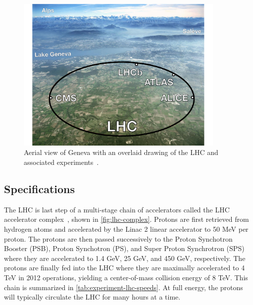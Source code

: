 \begin{figure}[tp]
  \centering
  \includegraphics[width=0.90\textwidth]{figures/lhc-atlas/lhc-switzerland}
  \caption{Aerial view of Geneva with an overlaid drawing of the LHC and associated experiments~\cite{atlas-surface}.}
  \label{fig:lhc-switzerland}
\end{figure}

\subsection{Specifications}

The LHC is last step of a multi-stage chain of accelerators called the LHC accelerator complex~\cite{cern-accelerators}, shown in \cref{fig:lhc-complex}. Protons are first retrieved from hydrogen atoms and accelerated by the Linac 2 linear accelerator to 50 MeV per proton. The protons are then passed successively to the Proton Synchotron Booster (PSB), Proton Synchotron (PS), and Super Proton Synchrotron (SPS) where they are accelerated to 1.4 GeV, 25 GeV, and 450 GeV, respectively. The protons are finally fed into the LHC where they are maximally accelerated to 4 TeV in 2012 operations, yielding a center-of-mass collision energy of 8 TeV. This chain is summarized in \cref{tab:experiment-lhc-speeds}. At full energy, the protons will typically circulate the LHC for many hours at a time.

